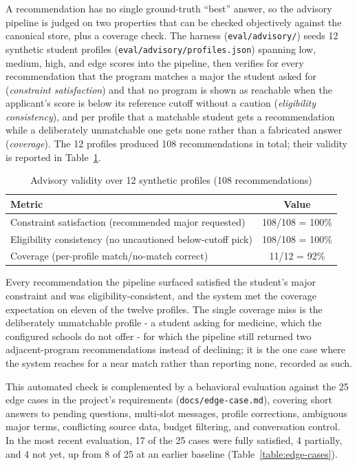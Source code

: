 \documentclass[../main.tex]{subfiles}
\begin{document}
A recommendation has no single ground-truth ``best'' answer, so the advisory pipeline is judged on two properties that can be checked objectively against the canonical store, plus a coverage check.
The harness (\texttt{eval/advisory/}) seeds 12 synthetic student profiles (\texttt{eval/advisory/profiles.json}) spanning low, medium, high, and edge scores into the pipeline, then verifies for every recommendation that the program matches a major the student asked for (\textit{constraint satisfaction}) and that no program is shown as reachable when the applicant's score is below its reference cutoff without a caution (\textit{eligibility consistency}), and per profile that a matchable student gets a recommendation while a deliberately unmatchable one gets none rather than a fabricated answer (\textit{coverage}).
The 12 profiles produced 108 recommendations in total; their validity is reported in Table~\ref{table:eval-advisory}.
\begin{table}[H]
    \centering
    \caption{Advisory validity over 12 synthetic profiles (108 recommendations)}
    \label{table:eval-advisory}
    \begin{tabular}{|p{8.5cm}|c|}
        \hline
        \textbf{Metric} & \textbf{Value} \\
        \hline
        Constraint satisfaction (recommended major requested) & 108/108 = 100\% \\
        \hline
        Eligibility consistency (no uncautioned below-cutoff pick) & 108/108 = 100\% \\
        \hline
        Coverage (per-profile match/no-match correct) & 11/12 = 92\% \\
        \hline
    \end{tabular}
\end{table}

Every recommendation the pipeline surfaced satisfied the student's major constraint and was eligibility-consistent, and the system met the coverage expectation on eleven of the twelve profiles.
The single coverage miss is the deliberately unmatchable profile - a student asking for medicine, which the configured schools do not offer - for which the pipeline still returned two adjacent-program recommendations instead of declining; it is the one case where the system reaches for a near match rather than reporting none, recorded as such.

This automated check is complemented by a behavioral evaluation against the 25 edge cases in the project's requirements (\texttt{docs/edge-case.md}), covering short answers to pending questions, multi-slot messages, profile corrections, ambiguous major terms, conflicting source data, budget filtering, and conversation control.
In the most recent evaluation, 17 of the 25 cases were fully satisfied, 4 partially, and 4 not yet, up from 8 of 25 at an earlier baseline (Table~\ref{table:edge-cases}).
\end{document}
